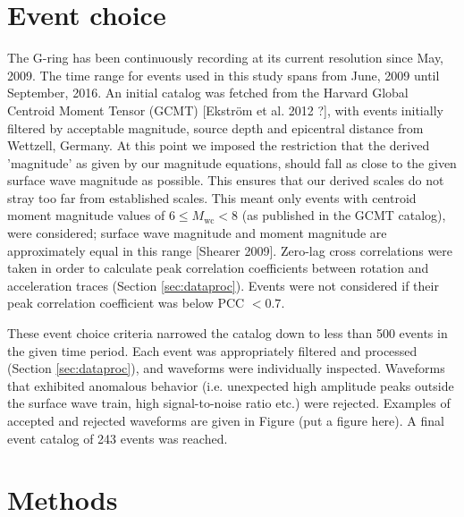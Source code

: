 \documentclass{gji}
\begin{document}
\section{Event choice}
The G-ring has been continuously recording at its current resolution since May, 2009. %
The time range for events used in this study spans from June, 2009 until September, 2016. An initial catalog was fetched from the Harvard Global Centroid Moment Tensor (GCMT) [Ekstr\"om et al. 2012 ?], %
with events initially filtered by acceptable magnitude, source depth and epicentral distance from Wettzell, Germany. At this point we imposed the restriction that the derived 'magnitude' as given by our magnitude equations, should fall as close to the given surface wave magnitude as possible. This ensures that our derived scales do not stray too far from established scales. This meant only events with centroid moment magnitude values of $6 \le M_{\text{wc}} < 8$ (as published in the GCMT catalog), were considered;   surface wave magnitude and moment magnitude are approximately equal in this range [Shearer 2009]. %
Zero-lag cross correlations were taken in order to calculate peak correlation coefficients between rotation and acceleration traces (Section \ref{sec:dataproc}). Events were not considered if their peak correlation coefficient was below PCC $< 0.7$. 

These event choice criteria narrowed the catalog down to less than 500 events in the given time period. Each event was appropriately filtered and processed (Section \ref{sec:dataproc}), and waveforms were individually inspected. Waveforms that exhibited anomalous behavior (i.e. unexpected high amplitude peaks outside the surface wave train, high signal-to-noise ratio etc.) were rejected. Examples of accepted and rejected waveforms are given in Figure (put a figure here). A final event catalog of 243 events was reached.

\section{Methods}
\end{document}
